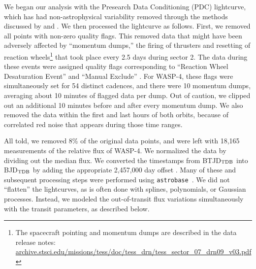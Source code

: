 \documentclass[12pt,twocolumn,tighten]{aastex62}
\begin{document}
We began our analysis with the Presearch Data Conditioning (PDC)
lightcurve, which has had non-astrophysical variability removed
through the methods discussed by \citet{smith_kepler_apertures_2017}
and \citet{smith_kepler_PDC_2017}.  We then processed the lightcurve
as follows.  First, we removed all points with non-zero quality flags.
This removed data that might have been adversely affected by
``momentum dumps,'' the firing of thrusters and resetting of reaction
wheels\footnote{The spacecraft pointing and momentum dumps are
described in the data release notes:
\url{archive.stsci.edu/missions/tess/doc/tess_drn/tess_sector_07_drn09_v03.pdf}}
that took place every 2.5 days during sector 2.  The data during these
events were assigned quality flags corresponding to ``Reaction Wheel
Desaturation Event'' and ``Manual Exclude'' \citep[][Table
28]{tess_data_product_description_2018}.  For WASP-4, these flags were
simultaneously set for 54 distinct cadences, and there were 10
momentum dumps, averaging about 10 minutes of flagged data per dump.
Out of caution, we clipped out an additional 10 minutes before and
after every momentum dump.  We also removed the data within the first
and last hours of both orbits, because of correlated red noise that
appears during those time ranges. 

All told, we removed 8\% of the original data points, and were left
with 18{,}165 measurements of the relative flux of WASP-4.  We
normalized the data by dividing out the median flux.  We converted the
timestamps from BTJD$_{\rm TDB}$ into BJD$_{\rm TDB}$ by adding the
appropriate 2{,}457{,}000 day offset
\citep{tess_data_product_description_2018}.  Many of these and
subsequent processing steps were performed using
\texttt{astrobase}~\citep{bhatti_astrobase_2018}. We did not
``flatten'' the lightcurves, as is often done with splines,
polynomials, or Gaussian processes.  Instead, we modeled the
out-of-transit flux variations simultaneously with the transit
parameters, as described below.
\end{document}
